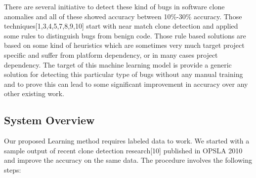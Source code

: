 \documentclass[nocopyrightspace]{sigplanconf}
\begin{document}
\vspace{10 pt}
\noindent
There are several initiative to detect these kind of bugs in software clone anomalies and all of these showed accuracy between 10\%-30\% accuracy. Those techniques[1,3,4,5,7,8,9,10] start with near match clone detection and applied some rules to distinguish bugs from benign code. Those rule based solutions are based on some kind of heuristics which are sometimes very much target project specific and suffer from platform dependency, or in many cases project dependency. The target of this machine learning model is provide a generic solution for detecting this particular type of bugs without any manual training and to prove this can lead to some significant improvement in accuracy over any other existing work.

\subsection{System Overview}
Our proposed Learning method requires labeled data to work. We started with a sample output of recent clone detection research[10] published in OPSLA 2010 and improve the accuracy on the same data. The procedure involves the following steps:
\end{document}
